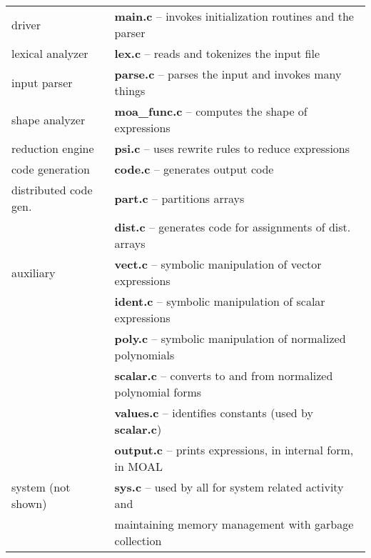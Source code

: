 \begin{tabular}{ll}
driver & {\bf main.c} -- invokes initialization routines and the parser \\
lexical analyzer & {\bf lex.c} -- reads and tokenizes the input file \\
input parser & {\bf parse.c} -- parses the input and invokes many things \\
shape analyzer & {\bf moa\_func.c} -- computes the shape of expressions \\
reduction engine & {\bf psi.c} -- uses rewrite rules to reduce expressions \\
code generation & {\bf code.c} -- generates output code \\
distributed code gen. & {\bf part.c} -- partitions arrays \\
 & {\bf dist.c} -- generates code for assignments of dist. arrays \\
auxiliary & {\bf vect.c} -- symbolic manipulation of vector expressions \\
 & {\bf ident.c} -- symbolic manipulation of scalar expressions \\
 & {\bf poly.c} -- symbolic manipulation of normalized polynomials \\
 & {\bf scalar.c} -- converts to and from normalized polynomial forms \\
 & {\bf values.c} -- identifies constants (used by {\bf scalar.c}) \\
 & {\bf output.c} -- prints expressions, in internal form, in MOAL \\
system (not shown) & {\bf sys.c} -- used by all for system related activity and \\
 & maintaining memory management with garbage collection \\
\end{tabular}

